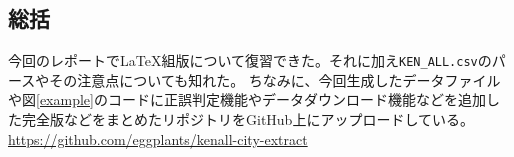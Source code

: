 \documentclass[a4j]{jarticle}
\begin{document}
\begin{multicols}{2}
	\vfill\null
	\columnbreak

	\section{総括}
	今回のレポートでLaTeX組版について復習できた。それに加え\texttt{KEN\_ALL.csv}のパースやその注意点についても知れた。
    ちなみに、今回生成したデータファイルや図\ref{example}のコードに正誤判定機能やデータダウンロード機能などを追加した完全版などをまとめたリポジトリをGitHub上にアップロードしている。
    \url{https://github.com/eggplants/kenall-city-extract}


	
	

\end{multicols}
\end{document}
